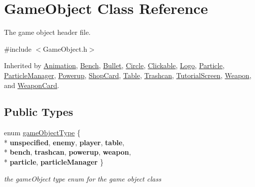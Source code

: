 \hypertarget{class_game_object}{\section{Game\+Object Class Reference}
\label{class_game_object}
}


The game object header file.  




{\ttfamily \#include $<$Game\+Object.\+h$>$}



Inherited by \hyperlink{class_animation}{Animation}, \hyperlink{class_bench}{Bench}, \hyperlink{class_bullet}{Bullet}, \hyperlink{class_circle}{Circle}, \hyperlink{class_clickable}{Clickable}, \hyperlink{class_logo}{Logo}, \hyperlink{class_particle}{Particle}, \hyperlink{class_particle_manager}{Particle\+Manager}, \hyperlink{class_powerup}{Powerup}, \hyperlink{class_shop_card}{Shop\+Card}, \hyperlink{class_table}{Table}, \hyperlink{class_trashcan}{Trashcan}, \hyperlink{class_tutorial_screen}{Tutorial\+Screen}, \hyperlink{class_weapon}{Weapon}, and \hyperlink{class_weapon_card}{Weapon\+Card}.

\subsection*{Public Types}
\begin{DoxyCompactItemize}
\item 
enum \hyperlink{class_game_object_ad5092169e581fb0772e01026882ea0c8}{game\+Object\+Type} \{ \\*
{\bfseries unspecified}, 
{\bfseries enemy}, 
{\bfseries player}, 
{\bfseries table}, 
\\*
{\bfseries bench}, 
{\bfseries trashcan}, 
{\bfseries powerup}, 
{\bfseries weapon}, 
\\*
{\bfseries particle}, 
{\bfseries particle\+Manager}
 \}
\begin{DoxyCompactList}\small\item\em the game\+Object type enum for the game object class \end{DoxyCompactList}\end{DoxyCompactItemize}
